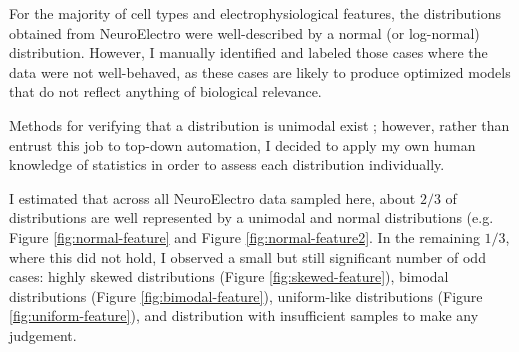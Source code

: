 %
For the majority of cell types and electrophysiological features, the distributions obtained from NeuroElectro were well-described by a normal (or log-normal) distribution.
However, I manually identified and labeled those cases where the data were not well-behaved, as these cases are likely to produce optimized models that do not reflect anything of biological relevance.

Methods for verifying that a distribution is unimodal exist \citep{maechler2013package}; however, rather than entrust this job to top-down automation, I decided to apply my own human knowledge of statistics in order to assess each distribution individually. %

I estimated that across all NeuroElectro data sampled here, about $2/3$ of distributions are well represented by a unimodal and normal distributions (e.g. Figure \ref{fig:normal-feature} and Figure \ref{fig:normal-feature2}.
In the remaining $1/3$, where this did not hold, I observed a small but still significant number of odd cases: highly skewed distributions (Figure \ref{fig:skewed-feature}), bimodal distributions (Figure \ref{fig:bimodal-feature}), uniform-like distributions (Figure \ref{fig:uniform-feature}), and distribution with insufficient samples to make any judgement.

